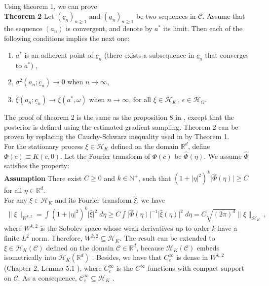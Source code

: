 \documentclass[a4paper,onecolumn]{article}
\theoremstyle{remark}
\begin{document}
Using theorem 1, we can prove\\
\textbf{Theorem 2}
Let $(\underline{c}_n)_{n\ge 1}$ and $(\underline{a}_n)_{n\ge 1}$ be two sequences in $\mathcal{C}$.
Assume that the sequence $(a_n)$ is convergent, and denote by $a^*$ its limit. Then each of the
following conditions implies the next one:
\begin{enumerate}
    \item $a^*$ is an adherent point of $\underline{c}_n$ (there exists a subsequence in 
          $\underline{c}_n$ that converges to $a^*$) ,
    \item $\sigma^2(a_n;\underline{c}_n)\rightarrow 0$  when $n\rightarrow \infty$,
    \item $\hat{\xi}(a_n; \underline{c}_n) \rightarrow \xi(a^*, \omega)$ when $n\rightarrow \infty$,
          for all $\xi \in \mathcal{H}_K\,,\, \epsilon \in \mathcal{H}_G$.
\end{enumerate}
The proof of theorem 2 is the same as the proposition 8 in \cite{convergen EI}, 
except that the posterior is
defined using the estimated gradient sampling. 
Theorem 2 can be proven by replacing the Cauchy-Schwarz
inequality used in \cite{convergen EI} by Theorem 1.\\

For the stationary process $\xi\in\mathcal{H}_K$ defined on the domain $\mathbb{R}^d$, define 
$\Phi(c) \equiv K(c, 0)$.
Let the Fourier transform of $\Phi(c)$ be $\hat{\Phi}(\eta)$. 
We assume $\hat{\Phi}$ satisfies the property:\\
\textbf{Assumption}
There exist $C\ge 0$ and $k \in\mathbb{N}^+$, such that
$(1+|\eta|^2)^k \big|\hat{\Phi}(\eta)\big|\ge C$ for all $\eta\in \mathbb{R}^d$.\\

For any $\xi\in \mathcal{H}_K$ and its Fourier transform $\hat{\xi}$, 
we have \cite{converge Bull}
\begin{equation}\begin{split}
    \big\|\xi\big\|_{W^{k,2}} = 
    \int (1+|\eta|^2)^k \big| \hat{\xi} \big|^2 \; d\eta 
    \ge C \int \big|\hat{\Phi}(\eta)\big|^{-1} \big|\hat{\xi}(\eta)\big|^2 \; d\eta
    = C \sqrt{(2\pi)^d} \big\|\xi\big\|_{\mathcal{H}_K}\,,
\end{split}
\label{space equal}
\end{equation}
where $W^{k,2}$ is the Sobolev space whose weak derivatives up to order $k$ 
have a finite $L^2$ norm. Therefore, $W^{k,2}\subseteq \mathcal{H}_K$.
The result can be extended to $\xi \in \mathcal{H}_K(\mathcal{C})$ defined on the domain 
$\mathcal{C}\in \mathbb{R}^d$, because $\mathcal{H}_K(\mathcal{C})$ embeds isometrically
into $\mathcal{H}_K(\mathbb{R}^d)$ \cite{RKHS aronszajn}. Besides, we have that
$C_c^\infty$ is dense in $W^{k,2}$ (Chapter 2, Lemma 5.1 \cite{Hilbert space Showalter Book}),
where $C_c^\infty$ is the $C^\infty$ functions with compact support on $\mathcal{C}$.
As a consequence, $\mathcal{C}^\infty_c\subseteq \mathcal{H}_K$ \cite{convergen EI}.\\
\end{document}
